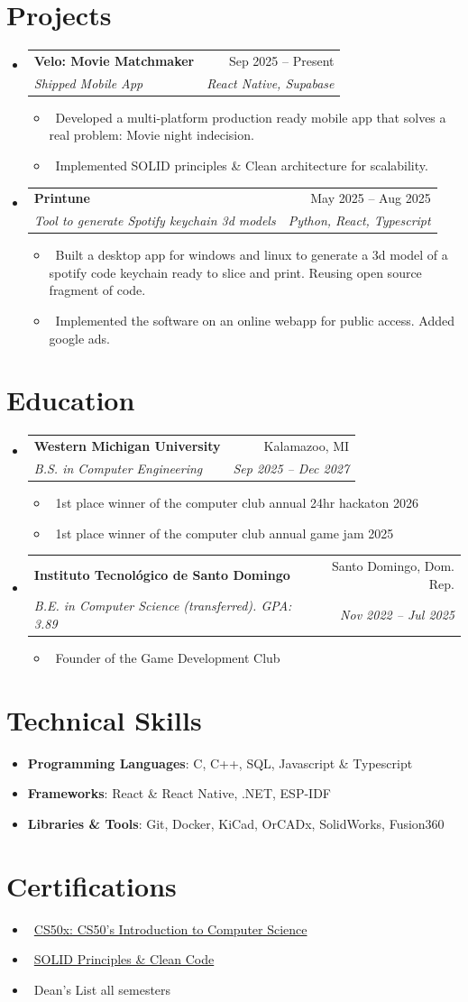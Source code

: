\documentclass[letterpaper,10pt]{article}
\makeatletter
\newcommand{\resumeItem}[1]{\item\small{#1}}
\newcommand{\resumeSubheading}[4]{
	\vspace{-1pt}\item
	\begin{tabular*}{0.97\textwidth}[t]{l@{\extracolsep{\fill}}r}
		\textbf{#1} & #2 \\
		\textit{#3} & \textit{#4} \\
	\end{tabular*}\vspace{-7pt}
}
\newcommand{\resumeSubHeadingList}{\begin{itemize}[leftmargin=0.15in, label={}]}
\newcommand{\resumeSubHeadingListEnd}{\end{itemize}}
\makeatother
\begin{document}
	\section{Projects}
	\resumeSubHeadingList
	\resumeSubheading
	{Velo: Movie Matchmaker}{Sep 2025 -- Present}
	{Shipped Mobile App}{React Native, Supabase}
	\resumeSubHeadingList
	\resumeItem{\textbullet\ Developed a multi-platform production ready mobile app that solves a real problem: Movie night indecision.}
	\resumeItem{\textbullet\ Implemented SOLID principles \& Clean architecture for scalability.}
	\resumeSubHeadingListEnd
	\resumeSubheading
	{Printune}{May 2025 -- Aug 2025} 
	{Tool to generate Spotify keychain 3d models}{Python, React, Typescript}
	\resumeSubHeadingList
	\resumeItem{\textbullet\ Built a desktop app for windows and linux to generate a 3d model of a spotify code keychain ready to slice and print. Reusing open source fragment of code.}
	\resumeItem{\textbullet\ Implemented the software on an online webapp for public access. Added google ads.}
	\resumeSubHeadingListEnd
	\resumeSubHeadingListEnd
	
	\section{Education}
	\resumeSubHeadingList
	\resumeSubheading
	{Western Michigan University}{Kalamazoo, MI}
	{B.S. in Computer Engineering}{Sep 2025 -- Dec 2027}
	\resumeSubHeadingList
	\resumeItem{\textbullet\ 1st place winner of the computer club annual 24hr hackaton 2026}
	\resumeItem{\textbullet\ 1st place winner of the computer club annual game jam 2025}
	\resumeSubHeadingListEnd
	\resumeSubheading
	{Instituto Tecnológico de Santo Domingo}{Santo Domingo, Dom. Rep.}
	{B.E. in Computer Science (transferred). GPA: 3.89}{Nov 2022 -- Jul 2025}
	\resumeSubHeadingList
	\resumeItem{\textbullet\ Founder of the Game Development Club}
	\resumeSubHeadingListEnd
	\resumeSubHeadingListEnd
	
	\section{Technical Skills}
	\resumeSubHeadingList
	\resumeItem{\textbf{Programming Languages}: C, C++, SQL, Javascript \& Typescript}
	\resumeItem{\textbf{Frameworks}: React \& React Native, .NET, ESP-IDF}
	\resumeItem{\textbf{Libraries \& Tools}: Git, Docker, KiCad, OrCADx, SolidWorks, Fusion360}
	\resumeSubHeadingListEnd
	
	\section{Certifications}
	\resumeSubHeadingList
	\resumeItem{\textbullet\ \href{https://courses.edx.org/certificates/db4c9dc4574240e2ac50c15613d1e4ca}{CS50x: CS50's Introduction to Computer Science}}
	\resumeItem{\textbullet\ \href{https://www.udemy.com/certificate/UC-f1f002cc-27ca-472d-b4ef-79b3e9f226c3/}{SOLID Principles \& Clean Code}}
	\resumeItem{\textbullet\ Dean's List all semesters}
	\resumeSubHeadingListEnd
	
\end{document}
